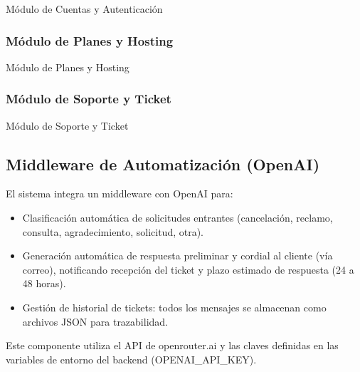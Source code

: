 \begin{center}
    \begin{table}[H]
        \caption{Módulo de Cuentas y Autenticación}
    \end{table}
\end{center}

\subsubsection{Módulo de Planes y Hosting}
\begin{center}
    \begin{table}[H]
        \caption{Módulo de Planes y Hosting}
    \end{table}
\end{center}

\subsubsection{Módulo de Soporte y Ticket}
\begin{center}
    \begin{table}[H]
        \caption{Módulo de Soporte y Ticket}
    \end{table}
\end{center}

\subsection{Middleware de Automatización (OpenAI)}
El sistema integra un middleware con OpenAI para:
\begin{itemize}
    \item Clasificación automática de solicitudes entrantes (cancelación, reclamo, consulta, agradecimiento, solicitud, otra).
    \item Generación automática de respuesta preliminar y cordial al cliente (vía correo), notificando recepción del ticket y plazo estimado de respuesta (24 a 48 horas).
    \item Gestión de historial de tickets: todos los mensajes se almacenan como archivos JSON para trazabilidad.
\end{itemize}
Este componente utiliza el API de openrouter.ai y las claves definidas en las variables de entorno del backend (OPENAI\_API\_KEY).

